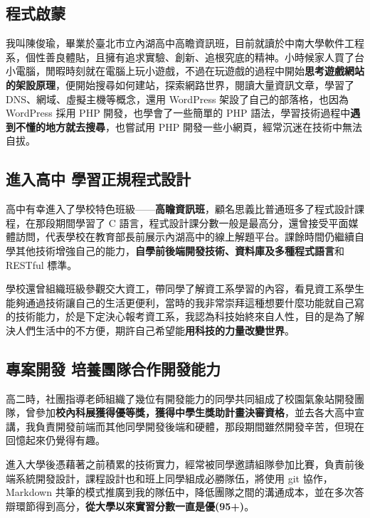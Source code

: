 \documentclass[classical]{einfart}
\let\LevelOneTitle\section
\begin{document}
{}

\subsection{程式啟蒙}

我叫陳俊瑜，畢業於臺北市立內湖高中高瞻資訊班，目前就讀於中南大學軟件工程系，個性善良體貼，且擁有追求實驗、創新、追根究底的精神。小時候家人買了台小電腦，閒暇時刻就在電腦上玩小遊戲，不過在玩遊戲的過程中開始\textbf{思考遊戲網站的架設原理}，便開始搜尋如何建站，探索網路世界，閱讀大量資訊文章，學習了
DNS、網域、虛擬主機等概念，還用 WordPress 架設了自己的部落格，也因為
WordPress 採用 PHP 開發，也學會了一些簡單的 PHP
語法，學習技術過程中\textbf{遇到不懂的地方就去搜尋}，也嘗試用 PHP
開發一些小網頁，經常沉迷在技術中無法自拔。

\subsection{進入高中 學習正規程式設計}

高中有幸進入了學校特色班級------\textbf{高瞻資訊班}，顧名思義比普通班多了程式設計課程，在那段期間學習了
C
語言，程式設計課分數一般是最高分，還曾接受平面媒體訪問，代表學校在教育部長前展示內湖高中的線上解題平台。課餘時間仍繼續自學其他技術增強自己的能力，\textbf{自學前後端開發技術、資料庫及多種程式語言}和
RESTful 標準。

學校還曾組織班級參觀交大資工，帶同學了解資工系學習的內容，看見資工系學生能夠通過技術讓自己的生活更便利，當時的我非常崇拜這種想要什麼功能就自己寫的技術能力，於是下定決心報考資工系，我認為科技始終來自人性，目的是為了解決人們生活中的不方便，期許自己希望能\textbf{用科技的力量改變世界}。

\subsection{專案開發 培養團隊合作開發能力}

高二時，社團指導老師組織了幾位有開發能力的同學共同組成了校園氣象站開發團隊，曾參加\textbf{校內科展獲得優等獎，獲得中學生獎助計畫決審資格}，並去各大高中宣講，我負責開發前端而其他同學開發後端和硬體，那段期間雖然開發辛苦，但現在回憶起來仍覺得有趣。

進入大學後憑藉著之前積累的技術實力，經常被同學邀請組隊參加比賽，負責前後端系統開發設計，課程設計也和班上同學組成必勝隊伍，將使用
git 協作，Markdown
共筆的模式推廣到我的隊伍中，降低團隊之間的溝通成本，並在多次答辯環節得到高分，\textbf{從大學以來實習分數一直是優(95+)}。
\end{document}

